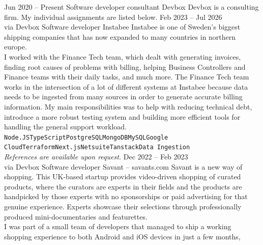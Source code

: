 \documentclass[9pt]{developercv} %
\begin{document}

\pagebreak
{}

\begin{entrylist}
  \entry
    {Jun 2020 -- Present}
    {Software developer consultant}
    {Devbox}
    {Devbox is a consulting firm. My individual assignments are listed below.}
  \entry
    {Feb 2023 -- Jul 2026\\\footnotesize{via Devbox}}
    {Software developer}
    {Instabee}
    {Instabee is one of Sweden's biggest shipping companies that has now
    expanded to many countries in northern europe.\\
    I worked with the Finance Tech team, which dealt with generating invoices,
    finding root causes of problems with billing, helping Business Controllers
    and Finance teams with their daily tasks, and much more. The Finance Tech
    team works in the intersection of a lot of different systems at Instabee
    because data needs to be ingested from many sources in order to generate
    accurate billing information. My main responsibilities was to help with
    reducing technical debt, introduce a more robust testing system and
    building more efficient tools for handling the general support workload.\\
    \texttt{Node.JS}\slashsep\texttt{TypeScript}\slashsep\texttt{PostgreSQL}\slashsep\texttt{MongoDB}\slashsep\texttt{MySQL}\slashsep\texttt{Google
    Cloud}\slashsep\texttt{Terraform}\slashsep\texttt{Next.js\slashsep\texttt{Netsuite}}\slashsep\texttt{Tanstack}\slashsep\texttt{Data Ingestion}\\
    \textit{References are available upon request.}
    }
  \entry
    {Dec 2022 -- Feb 2023\\\footnotesize{via Devbox}}
    {Software developer}
    {Savant -- savants.com}
    {Savant is a new way of shopping. This UK-based startup provides
    video-driven shopping of curated products, where the curators are experts
    in their fields and the products are handpicked by those experts with no
    sponsorships or paid advertising for that genuine experience. Experts
    showcase their selections through professionally produced
    mini-documentaries and featurettes.\\
    I was part of a small team of developers that managed to ship a working
    shopping experience to both Android and iOS devices in just a few months,
}
\end{entrylist}
\end{document}
